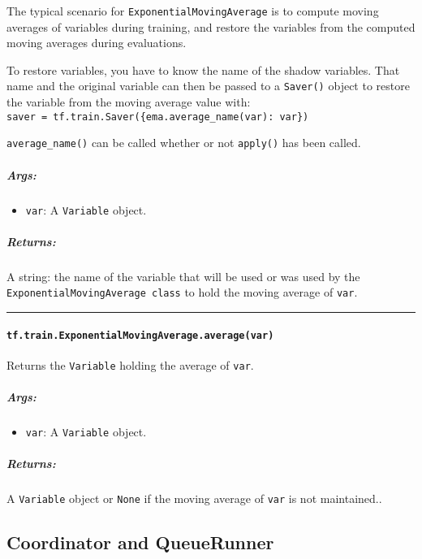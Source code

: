 The typical scenario for \texttt{ExponentialMovingAverage} is to compute
moving averages of variables during training, and restore the variables
from the computed moving averages during evaluations.

To restore variables, you have to know the name of the shadow variables.
That name and the original variable can then be passed to a
\texttt{Saver()} object to restore the variable from the moving average
value with:
\texttt{saver\ =\ tf.train.Saver(\{ema.average\_name(var):\ var\})}

\texttt{average\_name()} can be called whether or not \texttt{apply()}
has been called.

\subparagraph{Args: }\label{args-21}

\begin{itemize}
\tightlist
\item
  \texttt{var}: A \texttt{Variable} object.
\end{itemize}

\subparagraph{Returns: }\label{returns-14}

A string: the name of the variable that will be used or was used by the
\texttt{ExponentialMovingAverage\ class} to hold the moving average of
\texttt{var}.

\begin{center}\rule{0.5\linewidth}{\linethickness}\end{center}

\paragraph{\texorpdfstring{\texttt{tf.train.ExponentialMovingAverage.average(var)}
}{tf.train.ExponentialMovingAverage.average(var) }}\label{tf.train.exponentialmovingaverage.averagevar}

Returns the \texttt{Variable} holding the average of \texttt{var}.

\subparagraph{Args: }\label{args-22}

\begin{itemize}
\tightlist
\item
  \texttt{var}: A \texttt{Variable} object.
\end{itemize}

\subparagraph{Returns: }\label{returns-15}

A \texttt{Variable} object or \texttt{None} if the moving average of
\texttt{var} is not maintained..

\subsection{Coordinator and QueueRunner
}\label{coordinator-and-queuerunner}

